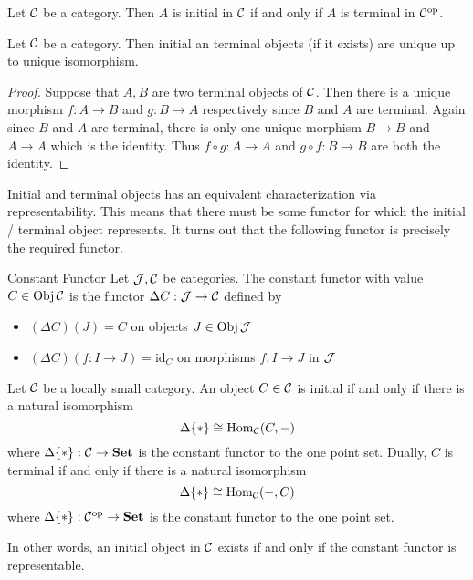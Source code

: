 \documentclass[a4paper]{article}
\begin{document}
\begin{lmm}{}{} Let $\mathcal{C}$ be a category. Then $A$ is initial in $\mathcal{C}$ if and only if $A$ is terminal in $\mathcal{C}^{\text{op}}$. 
\end{lmm}

\begin{prp}{}{} Let $\mathcal{C}$ be a category. Then initial an terminal objects (if it exists) are unique up to unique isomorphism. \tcbline
\begin{proof}
Suppose that $A,B$ are two terminal objects of $\mathcal{C}$. Then there is a unique morphism $f:A\to B$ and $g:B\to A$ respectively since $B$ and $A$ are terminal. Again since $B$ and $A$ are terminal, there is only one unique morphism $B\to B$ and $A\to A$ which is the identity. Thus $f\circ g:A\to A$ and $g\circ f:B\to B$ are both the identity. 
\end{proof}
\end{prp}

Initial and terminal objects has an equivalent characterization via representability. This means that there must be some functor for which the initial / terminal object represents. It turns out that the following functor is precisely the required functor. 

\begin{defn}{Constant Functor}{} Let $\mathcal{J},\mathcal{C}$ be categories. The constant functor with value $C\in\operatorname{Obj}\mathcal{C}$ is the functor $\Delta C:\mathcal{J}\to\mathcal{C}$ defined by 
\begin{itemize}
\item $(\Delta C)(J)=C$ on objects $J\in\operatorname{Obj}\mathcal{J}$
\item $(\Delta C)(f:I\to J)=\text{id}_C$ on morphisms $f:I\to J$ in $\mathcal{J}$
\end{itemize}
\end{defn}

\begin{prp}{}{} Let $\mathcal{C}$ be a locally small category. An object $C\in\mathcal{C}$ is initial if and only if there is a natural isomorphism $$\Delta\{\ast\}\cong\operatorname{Hom}_{\mathcal{C}}(C,-)$$ where $\Delta\{\ast\}:\mathcal{C}\to\bold{Set}$ is the constant functor to the one point set. Dually, $C$ is terminal if and only if there is a natural isomorphism $$\Delta\{\ast\}\cong\operatorname{Hom}_{\mathcal{C}}(-,C)$$ where $\Delta\{\ast\}:\mathcal{C}^\text{op}\to\bold{Set}$ is the constant functor to the one point set. 
\end{prp}

In other words, an initial object in $\mathcal{C}$ exists if and only if the constant functor is representable. 
\end{document}
